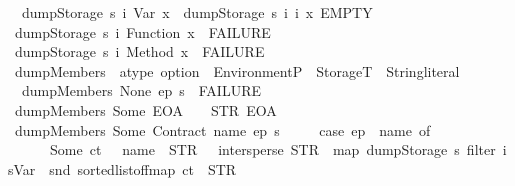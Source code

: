 \begin{isabellebody}
\ \ {\isachardoublequoteopen}dumpStorage\ s\ {\isacharparenleft}{\kern0pt}i{\isacharcomma}{\kern0pt}\ Var\ x{\isacharparenright}{\kern0pt}\ {\isacharequal}{\kern0pt}\ dump\isactrlsub S\isactrlsub t\isactrlsub o\isactrlsub r\isactrlsub a\isactrlsub g\isactrlsub e\ s\ i\ i\ x\ EMPTY{\isachardoublequoteclose}\isanewline
{\isacharbar}{\kern0pt}\ {\isachardoublequoteopen}dumpStorage\ s\ {\isacharparenleft}{\kern0pt}i{\isacharcomma}{\kern0pt}\ Function\ x{\isacharparenright}{\kern0pt}\ {\isacharequal}{\kern0pt}\ FAILURE{\isachardoublequoteclose}\isanewline
{\isacharbar}{\kern0pt}\ {\isachardoublequoteopen}dumpStorage\ s\ {\isacharparenleft}{\kern0pt}i{\isacharcomma}{\kern0pt}\ Method\ x{\isacharparenright}{\kern0pt}\ {\isacharequal}{\kern0pt}\ FAILURE{\isachardoublequoteclose}\isanewline
\isanewline
{}\isamarkupfalse%
\ dumpMembers\ {\isacharcolon}{\kern0pt}{\isacharcolon}{\kern0pt}\ {\isachardoublequoteopen}atype\ option\ {\isasymRightarrow}\ Environment\isactrlsub P\ {\isasymRightarrow}\ StorageT\ {\isasymRightarrow}\ String{\isachardot}{\kern0pt}literal{\isachardoublequoteclose}\ \isanewline
\ \ {\isachardoublequoteopen}dumpMembers\ None\ ep\ s\ {\isacharequal}{\kern0pt}\ FAILURE{\isachardoublequoteclose}\isanewline
{\isacharbar}{\kern0pt}\ {\isachardoublequoteopen}dumpMembers\ {\isacharparenleft}{\kern0pt}Some\ EOA{\isacharparenright}{\kern0pt}\ {\isacharunderscore}{\kern0pt}\ {\isacharunderscore}{\kern0pt}\ {\isacharequal}{\kern0pt}\ STR\ {\isacharprime}{\kern0pt}{\isacharprime}{\kern0pt}EOA{\isacharprime}{\kern0pt}{\isacharprime}{\kern0pt}{\isachardoublequoteclose}\isanewline
{\isacharbar}{\kern0pt}\ {\isachardoublequoteopen}dumpMembers\ {\isacharparenleft}{\kern0pt}Some\ {\isacharparenleft}{\kern0pt}Contract\ name{\isacharparenright}{\kern0pt}{\isacharparenright}{\kern0pt}\ ep\ s\ {\isacharequal}{\kern0pt}\isanewline
\ \ \ \ {\isacharparenleft}{\kern0pt}case\ ep\ {\isachardollar}{\kern0pt}{\isachardollar}{\kern0pt}\ name\ of\isanewline
\ \ \ \ \ \ Some\ {\isacharparenleft}{\kern0pt}ct{\isacharcomma}{\kern0pt}\ {\isacharunderscore}{\kern0pt}{\isacharparenright}{\kern0pt}\ {\isasymRightarrow}\ name\ {\isacharplus}{\kern0pt}\ STR\ {\isacharprime}{\kern0pt}{\isacharprime}{\kern0pt}{\isacharparenleft}{\kern0pt}{\isacharprime}{\kern0pt}{\isacharprime}{\kern0pt}\ {\isacharplus}{\kern0pt}\ {\isacharparenleft}{\kern0pt}intersperse\ {\isacharparenleft}{\kern0pt}STR\ {\isacharprime}{\kern0pt}{\isacharprime}{\kern0pt}{\isacharcomma}{\kern0pt}{\isacharprime}{\kern0pt}{\isacharprime}{\kern0pt}{\isacharparenright}{\kern0pt}\ {\isacharparenleft}{\kern0pt}map\ {\isacharparenleft}{\kern0pt}dumpStorage\ s{\isacharparenright}{\kern0pt}\ {\isacharparenleft}{\kern0pt}filter\ {\isacharparenleft}{\kern0pt}is{\isacharunderscore}{\kern0pt}Var\ {\isasymcirc}\ snd{\isacharparenright}{\kern0pt}\ {\isacharparenleft}{\kern0pt}sorted{\isacharunderscore}{\kern0pt}list{\isacharunderscore}{\kern0pt}of{\isacharunderscore}{\kern0pt}fmap\ ct{\isacharparenright}{\kern0pt}{\isacharparenright}{\kern0pt}{\isacharparenright}{\kern0pt}{\isacharparenright}{\kern0pt}\ {\isacharplus}{\kern0pt}\ STR\ {\isacharprime}{\kern0pt}{\isacharprime}{\kern0pt}{\isacharparenright}{\kern0pt}{\isacharprime}{\kern0pt}{\isacharprime}{\kern0pt}\isanewline

\end{isabellebody}
